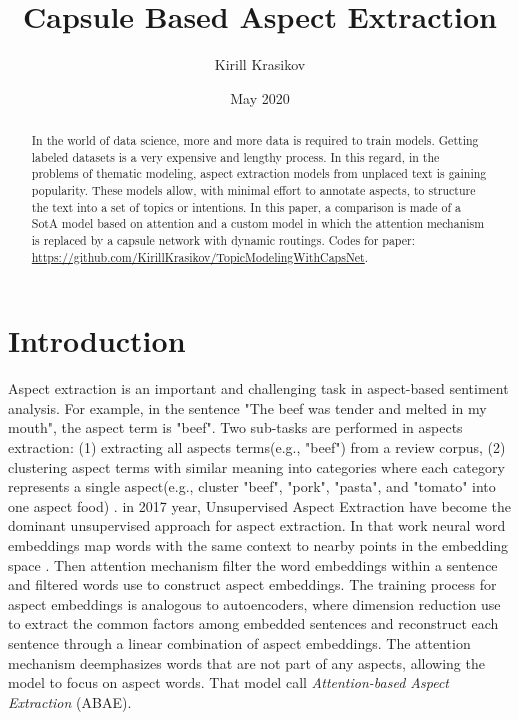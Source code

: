 \documentclass{article}
\title{Capsule Based Aspect Extraction}
\author{Kirill Krasikov}
\date{May 2020}
\begin{document}
\maketitle
\begin{abstract}
    In the world of data science, more and more data is required to train models. Getting labeled datasets is a very expensive and lengthy process. In this regard, in the problems of thematic modeling, aspect extraction models from unplaced text is gaining popularity. These models allow, with minimal effort to annotate aspects, to structure the text into a set of topics or intentions. In this paper, a comparison is made of a SotA model based on attention and a custom model in which the attention mechanism is replaced by a capsule network with dynamic routings.
    Codes for paper: \url{https://github.com/KirillKrasikov/TopicModelingWithCapsNet}.
\end{abstract}



\section{Introduction}
Aspect extraction is an important and challenging task in aspect-based sentiment analysis. For example, in the sentence "The beef was tender and melted in my mouth", the aspect term is "beef". Two sub-tasks are performed in aspects extraction: (1) extracting all aspects terms(e.g., "beef") from a review corpus, (2) clustering aspect terms with similar meaning into categories where each category represents a single aspect(e.g., cluster "beef", "pork", "pasta", and "tomato" into one aspect food) \cite{He2018ABAE}. in 2017 year, Unsupervised Aspect Extraction \cite{He2018ABAE} have become the dominant unsupervised approach for aspect extraction. In that work neural word embeddings map words with the same context to nearby points in the embedding space \cite{Mikolov2013W2V}. Then attention mechanism \cite{Bahdanau2015NMT} filter the word embeddings within a sentence and filtered words use to construct aspect embeddings. The training process for aspect embeddings is analogous to autoencoders, where dimension reduction use to extract the common factors among embedded sentences and reconstruct each sentence through a linear combination of aspect embeddings. The attention mechanism deemphasizes words that are not part of any aspects, allowing the model to focus on aspect words. That model call \textit{Attention-based Aspect Extraction} (ABAE).
\end{document}
